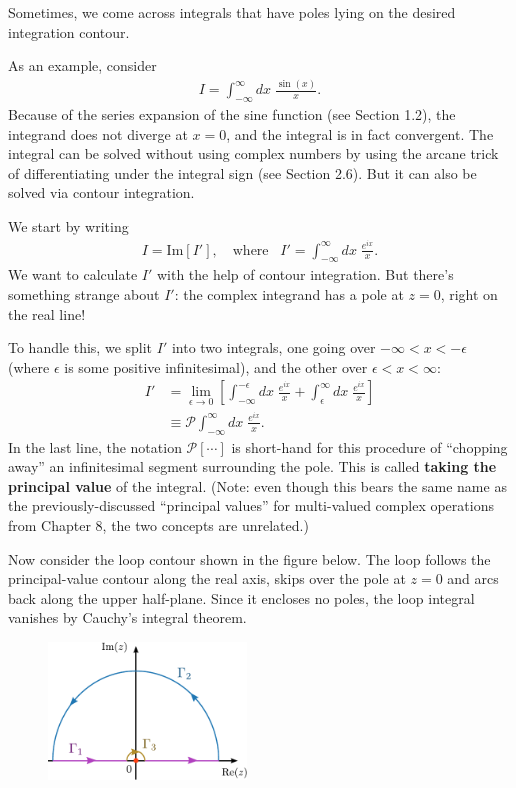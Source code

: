\documentclass[10pt,a4paper]{article}
\begin{document}
Sometimes, we come across integrals that have poles lying on the
desired integration contour.

As an example, consider
\begin{align}
  I = \int_{-\infty}^\infty dx\; \frac{\sin(x)}{x}.
\end{align}
Because of the series expansion of the sine function (see Section
1.2), the integrand does not diverge at $x = 0$, and the integral is
in fact convergent. The integral can be solved without using complex
numbers by using the arcane trick of differentiating under the
integral sign (see Section 2.6).  But it can also be solved via
contour integration.

We start by writing
\begin{align}
  I = \mathrm{Im}[I'], \quad \mathrm{where}\;\;\; I' = \int_{-\infty}^\infty dx\; \frac{e^{ix}}{x}.
\end{align}
We want to calculate $I'$ with the help of contour integration.  But
there's something strange about $I'$: the complex integrand has a pole
at $z = 0$, right on the real line!

To handle this, we split $I'$ into two integrals, one going over
$-\infty < x < -\epsilon$ (where $\epsilon$ is some positive
infinitesimal), and the other over $\epsilon < x < \infty$:
\begin{align}
  I' &= \lim_{\epsilon \rightarrow 0} \left[ \int_{-\infty}^{-\epsilon} dx\; \frac{e^{ix}}{x} + \int_{\epsilon}^\infty dx\; \frac{e^{ix}}{x}\right] \\
  &\equiv \mathcal{P} \int_{-\infty}^\infty dx\; \frac{e^{ix}}{x}.
\end{align}
In the last line, the notation $\mathcal{P}[\cdots]$ is short-hand for
this procedure of ``chopping away'' an infinitesimal segment
surrounding the pole.  This is called \textbf{taking the principal
  value} of the integral.  (Note: even though this bears the same name
as the previously-discussed ``principal values'' for multi-valued
complex operations from Chapter 8, the two concepts are unrelated.)

Now consider the loop contour shown in the figure below.  The loop
follows the principal-value contour along the real axis, skips over
the pole at $z = 0$ and arcs back along the upper half-plane.  Since
it encloses no poles, the loop integral vanishes by Cauchy's integral
theorem.

\begin{figure}[ht]
  \centering\includegraphics[width=0.47\textwidth]{principal_value_integral}
\end{figure}
\end{document}
